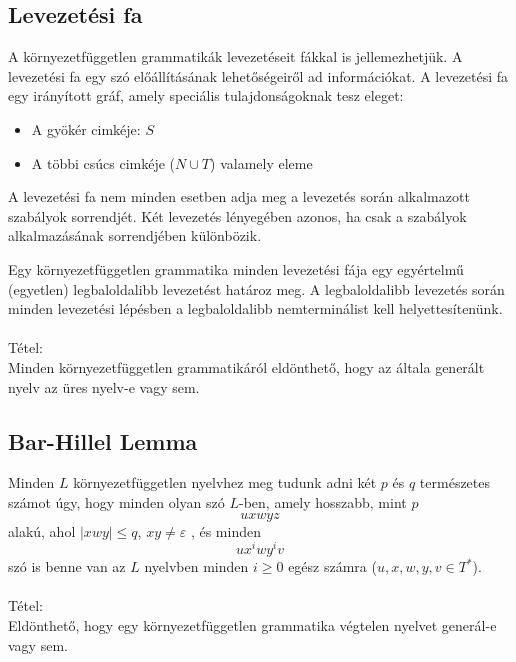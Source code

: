 \documentclass[margin=0px]{article}
\begin{document}
		\subsection{Levezetési fa}
			A környezetfüggetlen grammatikák levezetéseit fákkal is jellemezhetjük. A levezetési fa egy szó előállításának lehetőségeiről ad információkat. A levezetési fa egy irányított gráf, amely speciális tulajdonságoknak tesz eleget:
				\begin{itemize}
					\item A gyökér cimkéje: $S$
					\item A többi csúcs cimkéje ($N\cup T$) valamely eleme
				\end{itemize}
				A levezetési fa nem minden esetben adja meg a levezetés során alkalmazott szabályok sorrendjét. Két levezetés lényegében azonos, ha csak a szabályok alkalmazásának sorrendjében különbözik.
				
				Egy környezetfüggetlen grammatika minden levezetési fája egy egyértelmű (egyetlen) legbaloldalibb levezetést határoz meg. A legbaloldalibb levezetés során minden levezetési lépésben a legbaloldalibb nemterminálist kell helyettesítenünk.
				\\\\
				Tétel:\\
				Minden környezetfüggetlen grammatikáról eldönthető, hogy az általa generált nyelv az üres nyelv-e vagy sem.
		\subsection{Bar-Hillel Lemma}
			Minden $L$ környezetfüggetlen nyelvhez meg tudunk adni két $p$ és $q$ természetes számot úgy, hogy minden olyan szó $L$-ben, amely hosszabb, mint $p$
			\[uxwyz\]
			alakú, ahol $|xwy| \leq q$, $xy \neq \varepsilon$ , és minden 
			\[ux^iwy^iv\]
			szó is benne van az $L$ nyelvben minden $i \geq 0$ egész számra ($u,x,w,y,v \in T^*$).
			\\\\
			Tétel:\\
			Eldönthető, hogy egy környezetfüggetlen grammatika végtelen nyelvet generál-e vagy sem.
\end{document}
